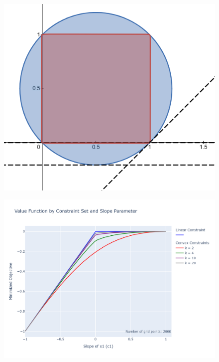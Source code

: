 \documentclass[11pt, aspectratio=169]{beamer}
\begin{document}
\begin{frame}
    \begin{figure}
        \includegraphics[height=0.9\textheight]{desmos_all.png}
    \end{figure}
\end{frame}

\begin{frame}
    \begin{figure}
        \includegraphics[height=0.9\textheight]{../figures/relax/value_function_by_constraint_set_dim_2.png}
    \end{figure}
\end{frame}
\end{document}
